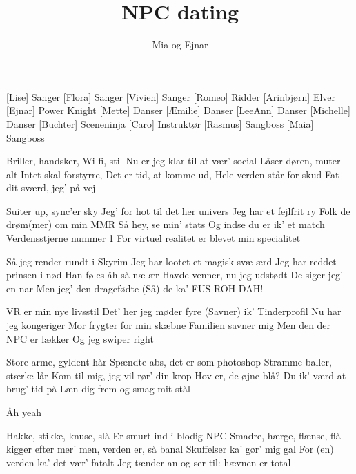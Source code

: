 \documentclass[a4paper,11pt]{article}
\title{NPC dating}
\author{Mia og Ejnar}
\begin{document}
\maketitle

\begin{roles}
  [Lise] Sanger
  [Flora] Sanger
  [Vivien] Sanger
  [Romeo] Ridder 
  [Arinbjørn] Elver
  [Ejnar] Power Knight
  [Mette] Danser
  [Æmilie] Danser
  [LeeAnn] Danser
  [Michelle] Danser
  [Buchter] Sceneninja
  [Caro] Instruktør
  [Rasmus] Sangboss
  [Maia] Sangboss
\end{roles}

\begin{song}

 Briller, handsker, Wi-fi, stil
 Nu er jeg klar til at vær' social
 Låser døren, muter alt
 Intet skal forstyrre,
 Det er tid, at komme ud,
 Hele verden står for skud
 Fat dit sværd, jeg' på vej

 Suiter up, sync'er sky
 Jeg' for hot til det her univers
 Jeg har et fejlfrit ry
 Folk de drøm(mer) om min MMR
 Så hey, se min' stats
 Og indse du er ik' et match
 Verdensstjerne nummer 1
 For virtuel realitet er blevet min specialitet

%
Så jeg render rundt i Skyrim
Jeg har lootet et magisk svæ-ærd
Jeg har reddet prinsen i nød
Han føles åh så næ-ær
Havde venner, nu jeg udstødt
De siger jeg' en nar
Men jeg' den dragefødte
(Så) de ka' FUS-ROH-DAH!

%
VR er min nye livsstil
Det' her jeg møder fyre
(Savner) ik' Tinderprofil
Nu har jeg kongeriger
Mor frygter for min skæbne
Familien savner mig
Men den der NPC er lækker
Og jeg swiper right

 Store arme, gyldent hår
 Spændte abs, det er som photoshop
 Stramme baller, stærke lår
 Kom til mig, jeg vil rør' din krop
 Hov er, de øjne blå?
 Du ik' værd at brug' tid på
 Læn dig frem og smag mit stål

 Åh yeah

 Hakke, stikke, knuse, slå
 Er smurt ind i blodig NPC
 Smadre, hærge, flænse, flå
 kigger efter mer' men,
 verden er, så banal
 Skuffelser ka' gør' mig gal
 For (en) verden ka' det vær' fatalt
 Jeg tænder an og ser til: hævnen er total


\end{song}
\end{document}
